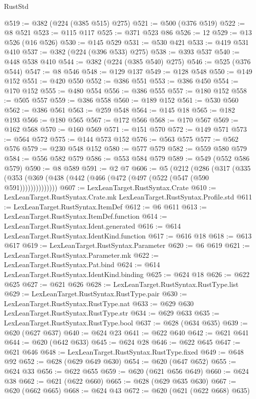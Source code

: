 \begin{lexlean}{RustStd}
\begin{coremodule}
@519 := @382 (@224 (@385 @515) @275)
@521 := @500 (@376 @519)
@522 := @8 @521
@523 := @115 @117
@525 := @371 @523 @86
@526 := 12
@529 := @13 @526 (@16 @526)
@530 := @145 @529
@531 := @530 @421
@533 := @419 @531 @410
@537 := @382 (@224 (@396 @533) @275)
@538 := @393 @537
@540 := @448 @538 @410
@544 := @382 (@224 (@385 @540) @275)
@546 := @525 (@376 @544)
@547 := @8 @546
@548 := @129 @137
@549 := @128 @548
@550 := @149 @152
@551 := @420 @550
@552 := @386 @551
@553 := @386 @450
@554 := @170 @152
@555 := @480 @554
@556 := @386 @555
@557 := @180 @152
@558 := @505 @557
@559 := @386 @558
@560 := @189 @152
@561 := @530 @560
@562 := @386 @561
@563 := @259 @548
@564 := @145 @18
@565 := @182 @193
@566 := @180 @565
@567 := @172 @566
@568 := @170 @567
@569 := @162 @568
@570 := @160 @569
@571 := @151 @570
@572 := @149 @571
@573 := @564 @572
@575 := @144 @573 @152
@576 := @563 @575
@577 := @562 @576
@579 := @230 @548 @152
@580 := @577 @579
@582 := @559 @580 @579
@584 := @556 @582 @579
@586 := @553 @584 @579
@589 := @549 (@552 @586 @579)
@590 := @8 @589
@591 := @2 @7
@606 := @5
    (@212
      (@286
        (@317 (@335 (@353 (@369 (@438 (@442 (@466 (@472 (@497 (@522 (@547 (@590 @591))))))))))))))
@607 := LexLeanTarget.RustSyntax.Crate
@610 := LexLeanTarget.RustSyntax.Crate.mk LexLeanTarget.RustSyntax.Profile.std
@611 := LexLeanTarget.RustSyntax.ItemDef
@612 := @6 @611
@613 := LexLeanTarget.RustSyntax.ItemDef.function
@614 := LexLeanTarget.RustSyntax.Ident.generated
@616 := @614 LexLeanTarget.RustSyntax.IdentKind.function
@617 := @616 @18
@618 := @613 @617
@619 := LexLeanTarget.RustSyntax.Parameter
@620 := @6 @619
@621 := LexLeanTarget.RustSyntax.Parameter.mk
@622 := LexLeanTarget.RustSyntax.Pat.bind
@624 := @614 LexLeanTarget.RustSyntax.IdentKind.binding
@625 := @624 @18
@626 := @622 @625
@627 := @621 @626
@628 := LexLeanTarget.RustSyntax.RustType.list
@629 := LexLeanTarget.RustSyntax.RustType.pair
@630 := LexLeanTarget.RustSyntax.RustType.nat
@633 := @629 @630 LexLeanTarget.RustSyntax.RustType.str
@634 := @629 @633
@635 := LexLeanTarget.RustSyntax.RustType.bool
@637 := @628 (@634 @635)
@639 := @620 (@627 @637)
@640 := @624 @23
@641 := @622 @640
@642 := @621 @641
@644 := @620 (@642 @633)
@645 := @624 @28
@646 := @622 @645
@647 := @621 @646
@648 := LexLeanTarget.RustSyntax.RustType.fixed
@649 := @648 @92
@652 := @628 (@629 @649 @630)
@654 := @620 (@647 @652)
@655 := @624 @33
@656 := @622 @655
@659 := @620 (@621 @656 @649)
@660 := @624 @38
@662 := @621 (@622 @660)
@665 := @628 (@629 @635 @630)
@667 := @620 (@662 @665)
@668 := @624 @43
@672 := @620 (@621 (@622 @668) @635)

\end{coremodule}
\end{lexlean}
